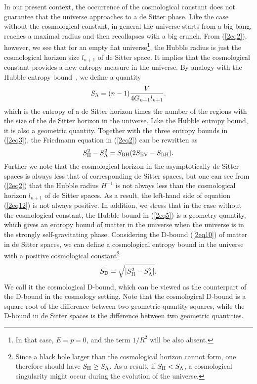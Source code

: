 \documentclass[a4paper,12pt]{article}
\begin{document}
In our present context, the occurrence of the cosmological
constant does not guarantee that the universe approaches to a de
Sitter phase. Like the case without the cosmological constant,
 in general the universe starts from a big bang, reaches a
maximal radius and then recollapses with a big crunch. From
(\ref{2eq2}), however, we see that for an empty flat
universe\footnote{In that case, $E=p=0$, and the term $1/R^2$ will be
also absent.}, the Hubble radius is just the cosmological horizon size
$l_{n+1}$ of de Sitter space. It implies that the cosmological constant
provides a new entropy measure in the universe. By analogy with the
Hubble entropy bound~\cite{FS,Hubb,Verl}, we define a quantity 
\begin{equation}
\label{2eq11} S_{\rm \Lambda} =(n-1)\frac{V}{4G_{n+1}l_{n+1}}.
\end{equation}
which  is the entropy of a de Sitter horizon times the number of the regions 
with the size of the de Sitter horizon  in
the universe. Like the Hubble entropy bound, it is also a geometric 
quantity.  Together with the  three entropy
bounds in (\ref{2eq3}),  the Friedmann equation in
(\ref{2eq2}) can be rewritten as
\begin{equation}
\label{2eq12}
  S_{\rm H}^2-S_{\rm \Lambda}^2=S_{\rm BH}(2S_{\rm BV}-S_{\rm
  BH}).
\end{equation}
Further we note that the cosmological horizon in the
asymptotically de Sitter spaces is always less that of corresponding de
Sitter spaces, but one can see from (\ref{2eq2}) that the Hubble radius $H^{-1}$ 
is not always less than the cosmological horizon $l_{n+1}$ of de Sitter spaces. 
As a result, the left-hand side of equation (\ref{2eq12}) is not always
positive. In addition, we stress that in the case without the
cosmological constant, the Hubble bound in (\ref{2eq5}) is a
geometry quantity, which gives an entropy bound of matter in the
universe when the universe is in the strongly self-gravitating
phase. Considering the D-bound (\ref{2eq10}) of matter in de
Sitter spaces, we can define a cosmological entropy
bound in the universe with a positive cosmological
constant\footnote{Since a black hole larger than the cosmological
horizon cannot form, one therefore should have $S_{\rm H} \ge
S_{\rm \Lambda}$. As a result, if $S_{\rm H} <S_{\rm \Lambda}$, a
cosmological singularity might occur during the evolution of the
universe.}
\begin{equation}
\label{2eq13}
 S_{\rm D}=\sqrt{|S_{\rm H}^2-S_{\rm
 \Lambda}^2|}.
\end{equation}
We call it the cosmological D-bound, which can be viewed as the
counterpart of the D-bound in the cosmology setting. Note that the cosmological 
D-bound is a square root of the difference between two geometric quantity 
squares, while  the D-bound in de Sitter spaces is the difference between two geometric
quantities. 
\end{document}
